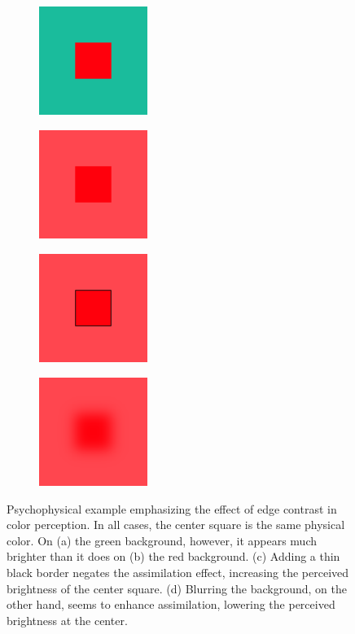 \documentclass[journal,onecolumn]{IEEEtran}
\begin{document}
\begin{figure}[h]
    \centering
    \begin{subfigure}{0.25\textwidth}
        \centering
        \includegraphics[width=100pt]{example_1a}
    \end{subfigure}%
    \begin{subfigure}{0.25\textwidth}
        \centering
        \includegraphics[width=100pt]{example_1b}
    \end{subfigure}%
    \begin{subfigure}{0.25\textwidth}
        \centering
        \includegraphics[width=100pt]{example_1c}
    \end{subfigure}%
    \begin{subfigure}{0.25\textwidth}
        \centering
        \includegraphics[width=100pt]{example_1d}
    \end{subfigure}%
    \caption{Psychophysical example emphasizing the effect of edge contrast in color perception. In all cases, the center square is the same physical color. On (a) the green background, however, it appears much brighter than it does on (b) the red background. (c) Adding a thin black border negates the assimilation effect, increasing the perceived brightness of the center square. (d) Blurring the background, on the other hand, seems to enhance assimilation, lowering the perceived brightness at the center.}
    \label{fig:blur-effect}
\end{figure}
\end{document}
